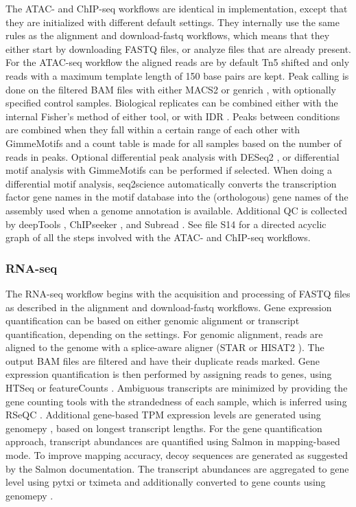 The ATAC- and ChIP-seq workflows are identical in implementation, except that they are initialized with different default settings. They internally use the same rules as the alignment and download-fastq workflows, which means that they either start by downloading FASTQ files,  or analyze files that are already present. For the ATAC-seq workflow the aligned reads are by default Tn5 shifted \cite{Yan2020} and only reads with a maximum template length of 150 base pairs are kept. Peak calling is done on the filtered BAM files with either MACS2 \cite{Zhang2008} or genrich \cite{genrich}, with optionally specified control samples. Biological replicates can be combined either with the internal Fisher's method of either tool, or with IDR \cite{idr}. Peaks between conditions are combined when they fall within a certain range of each other with GimmeMotifs \cite{Bruse_2018} and a count table is made for all samples based on the number of reads in peaks. Optional differential peak analysis with DESeq2 \cite{deseq2}, or differential motif analysis with GimmeMotifs \cite{Bruse_2018} can be performed if selected. When doing a differential motif analysis, seq2science automatically converts the transcription factor gene names in the motif database into the (orthologous) gene names of the assembly used when a genome annotation is available. Additional QC is collected by deepTools \cite{deeptools}, ChIPseeker \cite{chipseeker}, and Subread \cite{subread}. See file S14 for a directed acyclic graph of all the steps involved with the ATAC- and ChIP-seq workflows.

\subsubsection{RNA-seq}

The RNA-seq workflow begins with the acquisition and processing of FASTQ files as described in the alignment and download-fastq workflows. Gene expression quantification can be based on either genomic alignment or transcript quantification, depending on the settings. For genomic alignment, reads are aligned to the genome with a splice-aware aligner (STAR \cite{star} or HISAT2 \cite{hisat2}). The output BAM files are filtered and have their duplicate reads marked. Gene expression quantification is then performed by assigning reads to genes, using HTSeq\cite{Anders2014} or featureCounts \cite{subread}. Ambiguous transcripts are minimized by providing the gene counting tools with the strandedness of each sample, which is inferred using RSeQC \cite{rseqc}. Additional gene-based TPM expression levels are generated using genomepy \cite{Frlich2023}, based on longest transcript lengths. For the gene quantification approach, transcript abundances are quantified using Salmon \cite{salmon} in mapping-based mode. To improve mapping accuracy, decoy sequences are generated as suggested by the Salmon documentation. The transcript abundances are aggregated to gene level using pytxi \cite{pytxi} or tximeta \cite{tximeta} and additionally converted to gene counts using genomepy \cite{Frlich2023}. 


